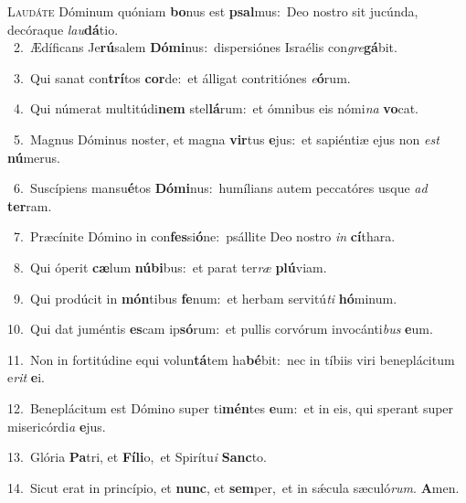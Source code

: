 \lettrine{\initial\textcolor{\initialcolor}{L}}{audáte} Dóminum quóniam \textbf{bo}\-nus est \textbf{psal}\-mus:~\star Deo nostro sit jucúnda, decóraque \textit{lau}\-\textbf{dá}tio.\\
{\numbfont\textcolor{\numbcolor}{~2.}}~Ædíficans Je\-\textbf{rú}\-salem \textbf{Dó}\-\textbf{mi}nus:~\star dispersiónes Israélis con\-\textit{gre}\-\textbf{gá}bit.\par
{\numbfont\textcolor{\numbcolor}{~3.}}~Qui sanat con\-\textbf{trí}\-tos \textbf{cor}\-de:~\star et álligat contritiónes \textit{e}\-\textbf{ó}rum.\par
{\numbfont\textcolor{\numbcolor}{~4.}}~Qui númerat multitúdi\textbf{nem} stel\-\textbf{lá}\-rum:~\star et ómnibus eis nómi\textit{na} \textbf{vo}\-cat.\par
{\numbfont\textcolor{\numbcolor}{~5.}}~Magnus Dóminus noster, et magna \textbf{vir}\-tus \textbf{e}\-jus:~\star et sapiéntiæ ejus non \textit{est} \textbf{nú}\-merus.\par
{\numbfont\textcolor{\numbcolor}{~6.}}~Suscípiens mansu\-\textbf{é}\-tos \textbf{Dó}\-\textbf{mi}nus:~\star humílians autem peccatóres usque \textit{ad} \textbf{ter}\-ram.\par
{\numbfont\textcolor{\numbcolor}{~7.}}~Præcínite Dómino in con\-\textbf{fes}\-si\-\textbf{ó}\-ne:~\star psállite Deo nostro \textit{in} \textbf{cí}\-thara.\par
{\numbfont\textcolor{\numbcolor}{~8.}}~Qui óperit \textbf{cæ}\-lum \textbf{nú}\-\textbf{bi}bus:~\star et parat ter\textit{ræ} \textbf{plú}\-viam.\par
{\numbfont\textcolor{\numbcolor}{~9.}}~Qui prodúcit in \textbf{món}\-tibus \textbf{fe}\-num:~\star et herbam servitú\textit{ti} \textbf{hó}\-minum.\par
{\numbfont\textcolor{\numbcolor}{10.}}~Qui dat juméntis \textbf{es}\-cam ip\-\textbf{só}\-rum:~\star et pullis corvórum invocánti\textit{bus} \textbf{e}\-um.\par
{\numbfont\textcolor{\numbcolor}{11.}}~Non in fortitúdine equi volun\-\textbf{tá}\-tem ha\-\textbf{bé}\-bit:~\star nec in tíbiis viri beneplácitum e\textit{rit} \textbf{e}\-i.\par
{\numbfont\textcolor{\numbcolor}{12.}}~Beneplácitum est Dómino super ti\-\textbf{mén}\-tes \textbf{e}\-um:~\star et in eis, qui sperant super misericórdi\textit{a} \textbf{e}\-jus.\par
{\numbfont\textcolor{\numbcolor}{13.}}~Glória \textbf{Pa}\-tri, et \textbf{Fí}\-\textbf{li}o,~\star et Spirítu\textit{i} \textbf{Sanc}\-to.\par
{\numbfont\textcolor{\numbcolor}{14.}}~Sicut erat in princípio, et \textbf{nunc}\-, et \textbf{sem}\-per,~\star et in sǽcula sæculó\-\textit{rum}\-. \textbf{A}\-men.\par
